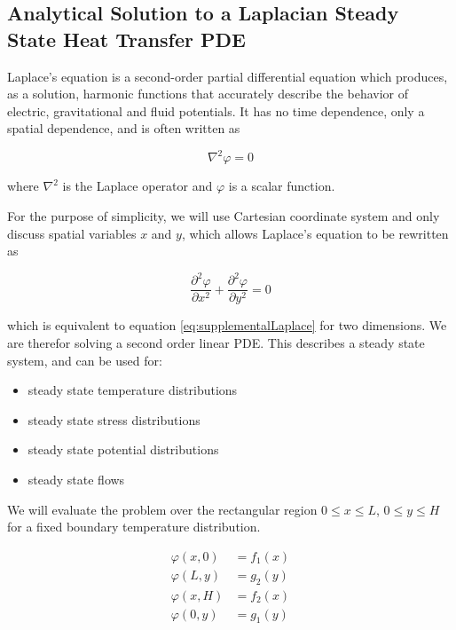 \subsection{Analytical Solution to a Laplacian Steady State Heat Transfer PDE}\label{section:pdeDerivation}


Laplace's equation is a second-order partial differential equation which produces, as a solution, harmonic functions that accurately describe the behavior of electric, gravitational and fluid potentials.  It has no time dependence, only a spatial dependence, and is often written as  

\begin{equation}\label{eq:supplementalLaplace}
\nabla^2 \varphi = 0
\end{equation}

where $\nabla^2$ is the Laplace operator and $\varphi$ is a scalar function.

For the purpose of simplicity, we will use Cartesian coordinate system and only discuss spatial variables $x$ and $y$, which allows Laplace's equation to be rewritten as

\begin{equation}\label{eq:supplementalLaplace2D}
\frac{\partial^2 \varphi}{\partial x^2} + \frac{\partial^2 \varphi}{\partial y^2} = 0
\end{equation}

which is equivalent to equation \ref{eq:supplementalLaplace} for two dimensions. We are therefor solving a second order linear PDE. This describes a steady state system, and can be used for: 

\begin{itemize}
  \item steady state temperature distributions
  \item steady state stress distributions
  \item steady state potential distributions
  \item steady state flows
\end{itemize}

We will evaluate the problem over the rectangular region $0 \leq x \leq L$, $0\leq y \leq H$ for a fixed boundary temperature distribution.

\begin{equation}\label{eq:supplementalBoundaryFunction}
\begin{split}
\varphi \left( x , 0 \right) & = f _ { 1 } \left( x \right) \\ 
\varphi \left( L , y \right) & = g _ { 2 } \left( y \right) \\ 
\varphi \left( x , H \right) & = f _ { 2 } \left( x \right) \\ 
\varphi \left( 0 , y \right) & = g _ { 1 } \left( y \right)
\end{split}
\end{equation}

